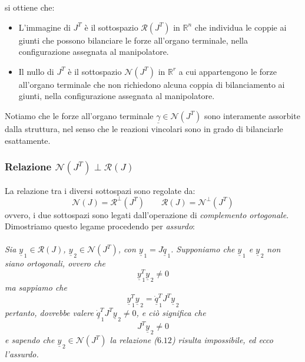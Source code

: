 si ottiene che:
\begin{itemize}
	\item L'immagine di $J^T$ è il sottospazio $\mathcal{R}(J^T)$ in $\mathbb{R}^n$ che individua le coppie ai giunti che possono bilanciare le forze all'organo terminale, nella configurazione assegnata al manipolatore.
	\item Il nullo di $J^T$ è il sottospazio $\mathcal{N}(J^T)$ in $\mathbb{R}^r$ a cui appartengono le forze all'organo terminale che non richiedono alcuna coppia di bilanciamento ai giunti, nella configurazione assegnata al manipolatore.
\end{itemize}
Notiamo che le forze all'organo terminale $\underline{\gamma} \in \mathcal{N}(J^T)$ sono interamente assorbite dalla struttura, nel senso che le reazioni vincolari sono in grado di bilanciarle esattamente.

\subsubsection{Relazione $\mathcal{N}(J^T) \perp \mathcal{R}(J)$}
La relazione tra i diversi sottospazi sono regolate da:
\begin{equation}
	\mathcal{N}(J) = \mathcal{R}^{\perp}(J^T) \qquad \mathcal{R}(J) = \mathcal{N}^{\perp}(J^T)
\end{equation}
ovvero, i due sottospazi sono legati dall'operazione di \emph{complemento ortogonale}. Dimostriamo questo legame procedendo per \emph{assurdo}:
\paragraph{}
\textit{
Sia $\underline{y}_{\,1} \in \mathcal{R}(J)$, $\underline{y}_{\,2} \in \mathcal{N}(J^T)$, con $\underline{y}_{\,1} = J \underline{\dot{q}}_{\,1}$. Supponiamo che $\underline{y}_{\,1}$ e $\underline{y}_{\,2}$ non siano ortogonali, ovvero che
\begin{equation}
	\underline{y}_{\,1}^T \underline{y}_{\,2} \neq 0
\end{equation} 
ma sappiamo che 
\begin{equation}
	\underline{y}_{\,1}^T \underline{y}_{\,2} = \underline{\dot{q}}_{\,1}^T J^T \underline{y}_{\,2}
\end{equation}
pertanto, dovrebbe valere $\underline{\dot{q}}_{\,1}^T J^T \underline{y}_{\,2} \neq 0$, e ciò significa che 
\begin{equation}
	J^T \underline{y}_{\,2} \neq 0
\end{equation}
e sapendo che $\underline{y}_{\,2} \in \mathcal{N}(J^T)$ la relazione ($6.12$) risulta impossibile, ed ecco l'assurdo.}